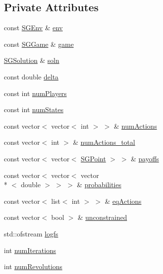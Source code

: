 \subsection*{Private Attributes}
\begin{DoxyCompactItemize}
\item 
const \hyperlink{classSGEnv}{S\-G\-Env} \& \hyperlink{classSGApprox_a6597417918c1e6c764f4f943c72af781}{env}
\item 
const \hyperlink{classSGGame}{S\-G\-Game} \& \hyperlink{classSGApprox_a0774e3ed0ff009809606a42c9e7ef727}{game}
\item 
\hyperlink{classSGSolution}{S\-G\-Solution} \& \hyperlink{classSGApprox_aaed7d16ba723bbdfbec94b21e0edff8e}{soln}
\item 
const double \hyperlink{classSGApprox_ad105b178e4e85845ce5a85e26d7d038b}{delta}
\item 
const int \hyperlink{classSGApprox_a6f512c1cb974247ecb24c2201f045905}{num\-Players}
\item 
const int \hyperlink{classSGApprox_a676bda37d610e501eac72037d22b5293}{num\-States}
\item 
const vector$<$ vector$<$ int $>$ $>$ \& \hyperlink{classSGApprox_af3208841348d868b372549dd7508e300}{num\-Actions}
\item 
const vector$<$ int $>$ \& \hyperlink{classSGApprox_a0b3cacf6c192238c0fa753c4d71358c6}{num\-Actions\-\_\-total}
\item 
const vector$<$ vector$<$ \hyperlink{classSGPoint}{S\-G\-Point} $>$ $>$ \& \hyperlink{classSGApprox_a053be8812a4cba4f529379dbfab0c5aa}{payoffs}
\item 
const vector$<$ vector$<$ vector\\*
$<$ double $>$ $>$ $>$ \& \hyperlink{classSGApprox_aaedd93c6e7faddcf4f33fceec383c562}{probabilities}
\item 
const vector$<$ list$<$ int $>$ $>$ \& \hyperlink{classSGApprox_ac737ccb3686428f766d9b69008dc897e}{eq\-Actions}
\item 
const vector$<$ bool $>$ \& \hyperlink{classSGApprox_a302549fb3037b3db0e6313db35229c97}{unconstrained}
\item 
std\-::ofstream \hyperlink{classSGApprox_aa95ff6bda46617fbaa7cf1c8d6708748}{logfs}
\item 
int \hyperlink{classSGApprox_a7ab53424f5933726a15001ff2885a4a9}{num\-Iterations}
\item 
int \hyperlink{classSGApprox_a2bd0cab80a3f8d799fdc2841b65dd2c2}{num\-Revolutions}
\item 

\end{DoxyCompactItemize}

